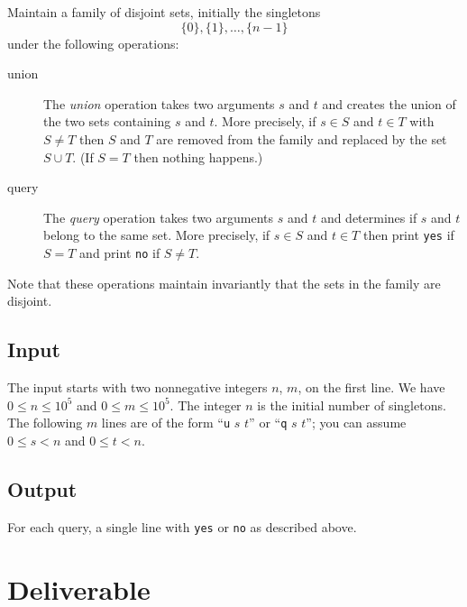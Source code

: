 \documentclass{tufte-handout}
\begin{document}
Maintain a family of disjoint sets, initially the singletons
\[ \{0\},\{1\}, \ldots,\{n-1\} \]
under the following operations:
\begin{description}
  \item[union]
The \emph{union} operation takes two arguments $s$ and $t$ and creates the union of the two sets containing $s$ and $t$.
More precisely, if $s\in S$ and $t\in T$ with $S\neq T$ then $S$ and $T$ are removed from the family and replaced by the set $S\cup T$. 
    (If $S=T$  then nothing happens.)
  \item[query]
    The \emph{query} operation takes two arguments $s$ and $t$ and determines if $s$ and $t$ belong to the same set.
    More precisely, if $s\in S$ and $t\in T$ then print \texttt{yes} if $S=T$ and print \texttt{no} if $S\neq T$.
\end{description}
Note that these operations maintain invariantly that the sets in the family are disjoint.

\subsection{Input}


The input starts with two nonnegative integers $n$, $m$, on the first line.
We have $0\leq n\leq 10^5$ and $0\leq m\leq 10^5$.
The integer $n$ is the initial number of singletons.
The following $m$ lines are of the form ``\texttt{u} $s$ $t$'' or ``\texttt{q} $s$ $t$''; you can assume $0\leq s< n$ and $0\leq t< n$.

\subsection{Output}


For each query, a single line with \texttt{yes} or \texttt{no} as described above.

\section{Deliverable}
\end{document}

